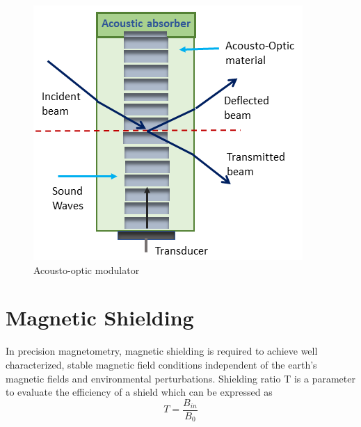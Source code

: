 \begin{figure}[h]
\centering
\includegraphics[width=0.7\linewidth]{figures/AOM}
\caption{Acousto-optic modulator}
\end{figure}

\section{Magnetic Shielding}
In precision magnetometry, magnetic shielding is required to achieve well characterized, stable magnetic field conditions independent of the earth’s magnetic fields and environmental perturbations. Shielding ratio T is a parameter to evaluate the efficiency of a shield which can be expressed as
\begin{equation}
 T = \frac{B_{in} }{B_0} 
\end{equation}

